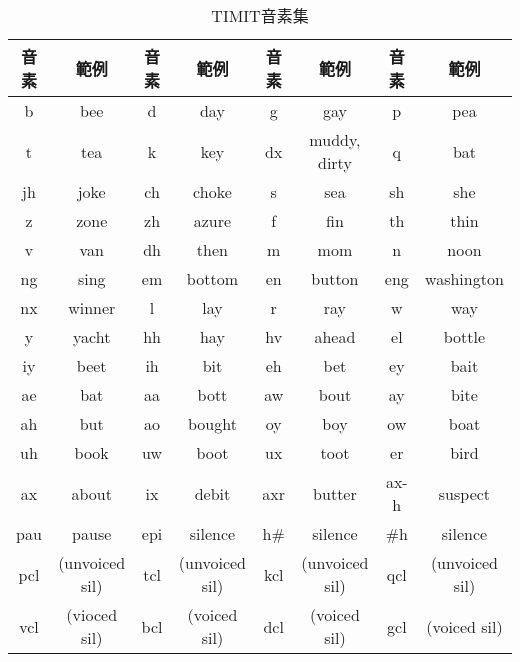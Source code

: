   \begin{table}
    \begin{center}
    \scalebox{0.7}
    {
      \begin{tabular}{|c|c|c|c|c|c|c|c|}
       \hline 音素 & 範例 & 音素 & 範例 & 音素 & 範例 & 音素 & 範例 \\
       \hline b & bee & d & day & g & gay & p & pea \\
       \hline t & tea & k & key & dx & muddy, dirty & q & bat \\
       \hline jh & joke & ch & choke & s & sea & sh & she \\
       \hline z & zone & zh & azure & f & fin & th & thin\\
       \hline v & van & dh & then & m & mom & n & noon \\
       \hline ng & sing & em & bottom & en & button & eng & washington\\
       \hline nx & winner & l & lay & r & ray & w & way \\
       \hline y & yacht & hh & hay & hv & ahead & el & bottle \\
       \hline iy & beet & ih & bit & eh & bet & ey & bait \\
       \hline ae & bat & aa & bott & aw & bout & ay & bite\\
       \hline ah & but & ao & bought & oy & boy & ow & boat\\
       \hline uh & book & uw & boot & ux & toot & er & bird\\
       \hline ax & about & ix & debit & axr & butter & ax-h & suspect\\
       \hline pau & pause & epi & silence & h\#  & silence & \#h & silence  \\
       \hline pcl & (unvoiced sil) & tcl & (unvoiced sil) & kcl & (unvoiced sil) & qcl & (unvoiced sil)  \\
       \hline vcl & (vioced sil) & bcl & (voiced sil) & dcl & (voiced sil) & gcl & (voiced sil) \\
       \hline
      \end{tabular}
    }
    \caption{TIMIT音素集}
    \label{tab:timit_phoneset}
    \end{center}
  \end{table}
  

